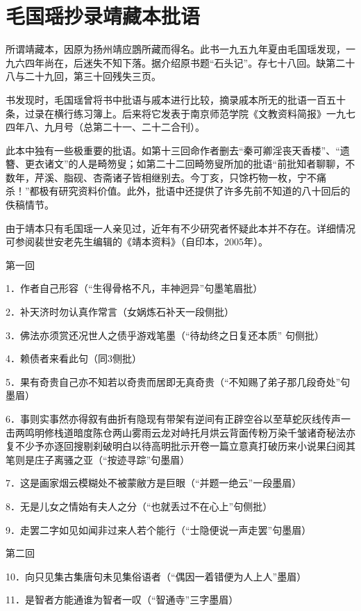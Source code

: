 
\chapter{毛国瑶抄录靖藏本批语}

所谓靖藏本，因原为扬州靖应鵾所藏而得名。此书一九五九年夏由毛国瑶发现，一九六四年尚在，后迷失不知下落。据介绍原书题``石头记''。存七十八回。缺第二十八与二十九回，第三十回残失三页。

书发现时，毛国瑶曾将书中批语与戚本进行比较，摘录戚本所无的批语一百五十条，过录在横行练习簿上。后来将它发表于南京师范学院《文教资料简报》一九七四年八、九月号（总第二十一、二十二合刊）。

此本中独有一些极重要的批语。如第十三回命作者删去``秦可卿淫丧天香楼''、``遗簪、更衣诸文''的人是畸笏叟；如第二十二回畸笏叟所加的批语``前批知者聊聊，不数年，芹溪、脂砚、杏斋诸子皆相继别去。今丁亥，只馀朽物一枚，宁不痛杀！''都极有研究资料价值。此外，批语中还提供了许多先前不知道的八十回后的佚稿情节。

由于靖本只有毛国瑶一人亲见过，近年有不少研究者怀疑此本并不存在。详细情况可参阅裴世安老先生编辑的《靖本资料》（自印本，2005年）。

第一回

1．作者自己形容{（\kaishu ``生得骨格不凡，丰神迥异''句墨笔眉批）}

2．补天济时勿认真作常言{（\kaishu 女娲炼石补天一段侧批）}

3．佛法亦须赏还况世人之债乎游戏笔墨{（\kaishu ``待劫终之日复还本质''
句侧批）}

4．赖债者来看此句{（\kaishu 同3侧批）}

5．果有奇贵自己亦不知若以奇贵而居即无真奇贵{（\kaishu ``不知赐了弟子那几段奇处''句墨眉）}

6．事则实事然亦得叙有曲折有隐现有带架有逆间有正辟空谷以至草蛇灰线传声一击两鸣明修栈道暗度陈仓两山雾雨云龙对峙托月烘云背面传粉万染千皱诸奇秘法亦复不少予亦逐回搜剔刹破明白以待高明批示开卷一篇立意真打破历来小说果臼阅其笔则是庄子离骚之亚{（\kaishu ``按迹寻踪''句墨眉）}

7．这是画家烟云模糊处不被蒙敝方是巨眼{（\kaishu ``并题一绝云''一段墨眉）}

8．无是儿女之情始有夫人之分{（\kaishu ``也就丢过不在心上''句侧批）}

9．走罢二字如见如闻非过来人若个能行{（\kaishu ``士隐便说一声走罢''句墨眉）}

第二回

10．向只见集古集唐句未见集俗语者{（\kaishu ``偶因一着错便为人上人''墨眉）}

11．是智者方能通谁为智者一叹{（\kaishu ``智通寺''三字墨眉）}

